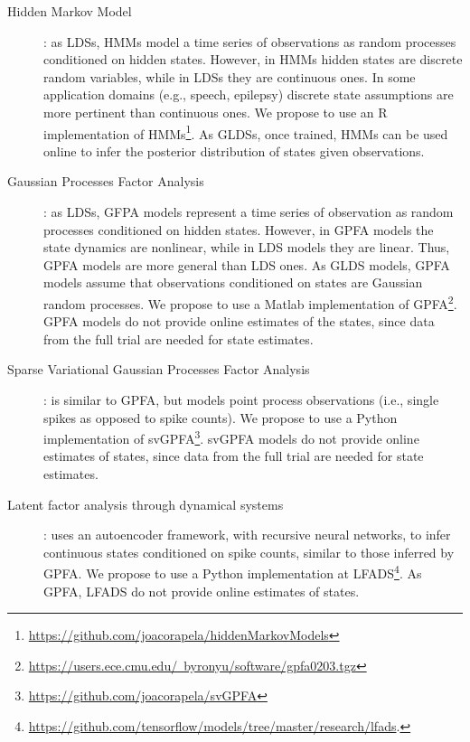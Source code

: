 \documentclass[a4paper,11point]{article}
\begin{document}
\begin{description}
    \item[Hidden Markov Model]\citep[HMM;][]{rabiner89}: as LDSs, HMMs model a
        time series of observations as random processes conditioned on hidden
        states. However, in HMMs hidden states are discrete random variables,
        while in LDSs they are continuous ones. In some application domains
        (e.g., speech, epilepsy) discrete state assumptions are more pertinent
        than continuous ones. We propose to use an R implementation of
        HMMs\footnote{\href{https://github.com/joacorapela/hiddenMarkovModels}{https://github.com/joacorapela/hiddenMarkovModels}}.
        As GLDSs, once trained, HMMs can be used online to infer the posterior
        distribution of states given observations.

    \item[Gaussian Processes Factor Analysis]\citep[GPFA;][]{yuEtAl09}: as
        LDSs, GFPA models represent a time series of observation as random
        processes conditioned on hidden states. However, in GPFA models the
        state dynamics are nonlinear, while in LDS models they are linear.
        Thus, GPFA models are more general than LDS ones. As GLDS models, GPFA
        models assume that observations conditioned on states are Gaussian
        random processes. We propose to use a Matlab implementation of
        GPFA\footnote{\href{https://users.ece.cmu.edu/~byronyu/software/gpfa0203.tgz}{https://users.ece.cmu.edu/~byronyu/software/gpfa0203.tgz}}.
        GPFA models do not provide online estimates of the states, since data
        from the full trial are needed for state estimates.

    \item[Sparse Variational Gaussian Processes Factor
        Analysis]\citep[svGPFA;][]{dunckerAndSahani18}: is similar to GPFA, but
        models point process observations (i.e., single spikes as opposed to
        spike counts). We propose to use a Python implementation of
        svGPFA\footnote{\href{https://github.com/joacorapela/svGPFA}{https://github.com/joacorapela/svGPFA}}.
        svGPFA models do not provide online estimates of states, since data
        from the full trial are needed for state estimates.

    \item[Latent factor analysis through dynamical
        systems]\citep[LFADS;][]{pandarinathEtAl18}: uses an autoencoder
        framework, with recursive neural networks, to infer continuous states
        conditioned on spike counts, similar to those inferred by GPFA. We
        propose to use a Python implementation at
        LFADS\footnote{\href{https://github.com/tensorflow/models/tree/master/research/lfads}{https://github.com/tensorflow/models/tree/master/research/lfads}.}.
        As GPFA, LFADS do not provide online estimates of states.

\end{description}
\end{document}
